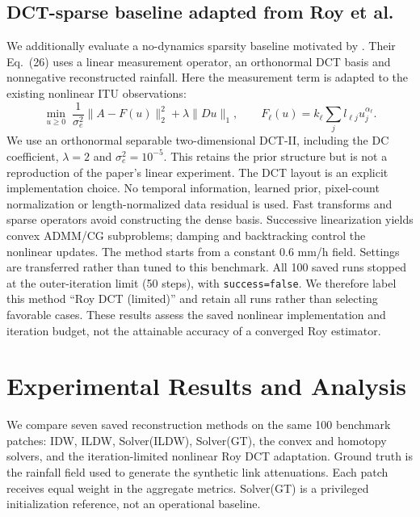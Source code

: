 \documentclass[a4paper,fleqn]{cas-sc}
\begin{document}
\subsection{DCT-sparse baseline adapted from Roy et al.}
We additionally evaluate a no-dynamics sparsity baseline motivated by
\citet{roy2016dynamic}. Their Eq.~(26) uses a linear measurement operator,
an orthonormal DCT basis and nonnegative reconstructed rainfall. Here the
measurement term is adapted to the existing nonlinear ITU observations:
\[
 \min_{u\geq0}\;\frac{1}{\sigma_e^2}\|A-F(u)\|_2^2+\lambda\|Du\|_1,
 \qquad F_\ell(u)=k_\ell\sum_j l_{\ell j}u_j^{\alpha_\ell}.
\]
We use an orthonormal separable two-dimensional DCT-II, including the DC
coefficient, $\lambda=2$ and $\sigma_e^2=10^{-5}$. This retains the prior
structure but is not a reproduction of the paper's linear experiment.
The DCT layout is an explicit implementation choice. No temporal information,
learned prior, pixel-count normalization or length-normalized data residual is
used. Fast transforms and sparse operators avoid constructing the dense basis.
Successive linearization yields convex ADMM/CG subproblems; damping and
backtracking control the nonlinear updates. The method starts from a constant
0.6 mm/h field. Settings are transferred rather than tuned to this benchmark.
All 100 saved runs stopped at the outer-iteration limit (50 steps), with
\texttt{success=false}. We therefore label this method ``Roy DCT (limited)''
and retain all runs rather than selecting favorable cases. These results assess
the saved nonlinear implementation and iteration budget, not the attainable
accuracy of a converged Roy estimator.
\section{Experimental Results and Analysis}
We compare seven saved reconstruction methods on the same 100 benchmark
patches: IDW, ILDW, Solver(ILDW), Solver(GT), the convex and homotopy solvers,
and the iteration-limited nonlinear Roy DCT adaptation. Ground truth is the
rainfall field used to generate the synthetic link attenuations. Each patch
receives equal weight in the aggregate metrics. Solver(GT) is a privileged
initialization reference, not an operational baseline.
\end{document}
